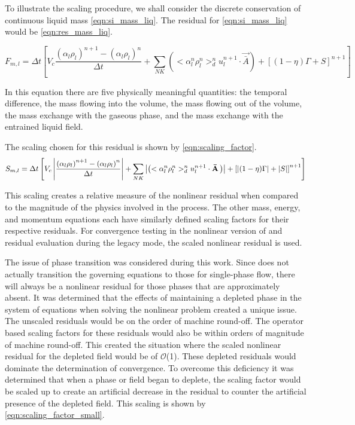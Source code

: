 To illustrate the scaling procedure, we shall consider the discrete conservation of continuous liquid mass \eqref{eqn:si_mass_liq}.
The residual for \eqref{eqn:si_mass_liq} would be \eqref{eqn:res_mass_liq}.

\begin{equation}
\label{eqn:res_mass_liq}
F_{m,l} = \Delta t \left[ V_c \frac{\left(\alpha_l \rho_l \right)^{n+1} - \left(\alpha_l \rho_l \right)^{n}}{\Delta t} + \sum_{NK}\left( <\alpha^n_l \rho^n_l>^{n}_{d} u^{n+1}_l  \cdot \vec{\bar{A}}\right) + \left[(1-\eta)\Gamma + S \right]^{n+1}\right]
\end{equation}

In this equation there are five physically meaningful quantities: the temporal difference, the mass flowing into  the volume, the mass flowing out of the volume, the mass exchange with the gaseous phase, and the mass exchange with the entrained liquid field.

The scaling chosen for this residual is shown by \eqref{eqn:scaling_factor}.
\begin{equation}
\label{eqn:scaling_factor}
S_{m,l} = \Delta t \left[ V_c \abs{\frac{\left(\alpha_l \rho_l \right)^{n+1} - \left(\alpha_l \rho_l \right)^{n}}{\Delta t}} + \sum_{NK}\abs{\left( <\alpha^n_l \rho^n_l>^{n}_{d} u^{n+1}_l  \cdot \vec{\bar{A}}\right)} + \left[\abs{(1-\eta)\Gamma} + \abs{S} \right]^{n+1}\right]
\end{equation}

This scaling creates a relative measure of the nonlinear residual when compared to the magnitude of the physics involved in the process.
The other mass, energy, and momentum equations each have similarly defined scaling factors for their respective residuals.
For convergence testing in the nonlinear version of \cobra{} and residual evaluation during the legacy mode, the scaled nonlinear residual is used.

The issue of phase transition was considered during this work.
Since \cobra{} does not actually transition the governing equations to those for single-phase flow, there will always be a nonlinear residual for those phases that are approximately absent.
It was determined that the effects of maintaining a depleted phase in the system of equations when solving the nonlinear problem created a unique issue.
The unscaled residuals would be on the order of machine round-off.
The operator based scaling factors for these residuals would also be within orders of magnitude of machine round-off.
This created the situation where the scaled nonlinear residual for the depleted field would be of $\mathcal{O}$(1).
These depleted residuals would dominate the determination of convergence.
To overcome this deficiency it was determined that when a phase or field began to deplete, the scaling factor would be scaled up to create an artificial decrease in the residual to counter the artificial presence of the depleted field.
This scaling is shown by \eqref{eqn:scaling_factor_small}.

